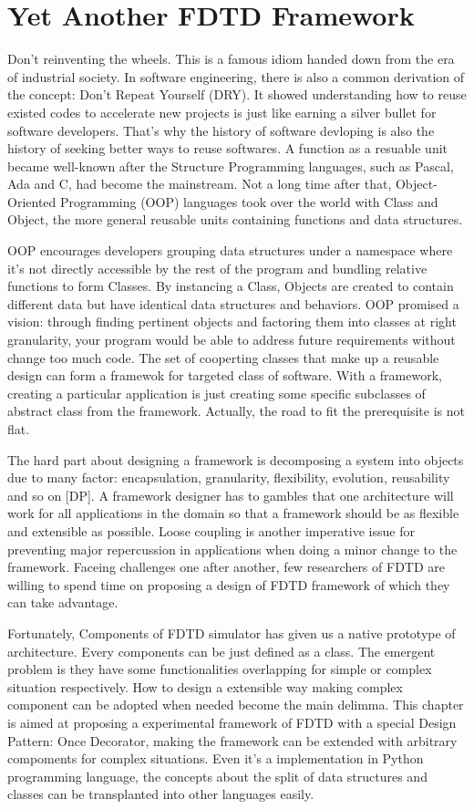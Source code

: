 \section{Yet Another FDTD Framework}

Don't reinventing the wheels. This is a famous idiom handed down from the era of industrial society. In software
engineering, there is also a common derivation of the concept: Don't Repeat Yourself (DRY). It showed understanding how
to reuse existed codes to accelerate new projects is just like earning a silver bullet for software developers. That's
why the history of software devloping is also the history of seeking better ways to reuse softwares. A function as a
resuable unit became well-known after the Structure Programming languages, such as Pascal, Ada and C, had become the
mainstream. Not a long time after that, Object-Oriented Programming (OOP) languages took over the world with Class and
Object, the more general reusable units containing functions and data structures.

OOP encourages developers grouping data structures under a namespace where it's not directly accessible by the rest of
the program and bundling relative functions to form Classes. By instancing a Class, Objects are created to contain
different data but have identical data structures and behaviors. OOP promised a vision: through finding pertinent
objects and factoring them into classes at right granularity, your program would be able to address future requirements
without change too much code. The set of cooperting classes that make up a reusable design can form a framewok for
targeted class of software. With a framework, creating a particular application is just creating some specific
subclasses of abstract class from the framework. Actually, the road to fit the prerequisite is not flat.

The hard part about designing a framework is decomposing a system into objects due to many factor: encapsulation,
granularity, flexibility, evolution, reusability and so on [DP]. A framework designer has to gambles that one
architecture will work for all applications in the domain so that a framework should be as flexible and extensible as
possible. Loose coupling is another imperative issue for preventing major repercussion in applications when doing a
minor change to the framework. Faceing challenges one after another, few researchers of FDTD are willing to spend time
on proposing a design of FDTD framework of which they can take advantage.

Fortunately, Components of FDTD simulator has given us a native prototype of architecture. Every components can be just
defined as a class. The emergent problem is they have some functionalities overlapping for simple or complex situation
respectively. How to design a extensible way making complex component can be adopted when needed become the main
delimma. This chapter is aimed at proposing a experimental framework of FDTD with a special Design Pattern: Once
Decorator, making the framework can be extended with arbitrary compoments for complex situations. Even it's a
implementation in Python programming language, the concepts about the split of data structures and classes can be
transplanted into other languages easily.

